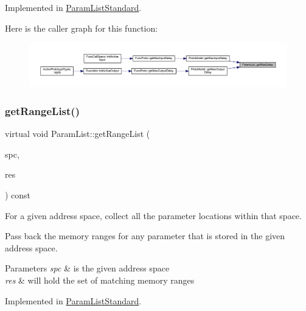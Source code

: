 Implemented in \mbox{\hyperlink{class_param_list_standard_aeb0fe74f815ad09f021ace22eb60d06a}{Param\+List\+Standard}}.

Here is the caller graph for this function\+:
\nopagebreak
\begin{figure}[H]
\begin{center}
\leavevmode
\includegraphics[width=350pt]{class_param_list_af3d5640d0912fca118219d8213ed3a28_icgraph}
\end{center}
\end{figure}
\mbox{\label{class_param_list_a35f41fbd1143cba10bd81cd5a81ad476}} 
\subsubsection{\texorpdfstring{getRangeList()}{getRangeList()}}
{\footnotesize\ttfamily virtual void Param\+List\+::get\+Range\+List (\begin{DoxyParamCaption}\item[{\mbox{\hyperlink{class_addr_space}{Addr\+Space}} $\ast$}]{spc,  }\item[{\mbox{\hyperlink{class_range_list}{Range\+List}} \&}]{res }\end{DoxyParamCaption}) const\hspace{0.3cm}{\ttfamily [pure virtual]}}



For a given address space, collect all the parameter locations within that space. 

Pass back the memory ranges for any parameter that is stored in the given address space. 
\begin{DoxyParams}{Parameters}
{\em spc} & is the given address space \\
\hline
{\em res} & will hold the set of matching memory ranges \\
\hline
\end{DoxyParams}


Implemented in \mbox{\hyperlink{class_param_list_standard_a715b7fc4875a69e7e5b8b498002f03de}{Param\+List\+Standard}}.

